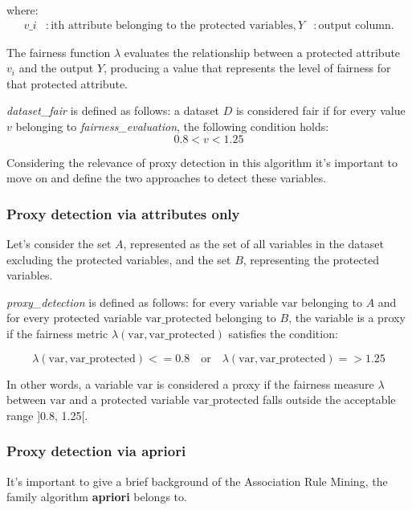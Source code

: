 \documentclass[12pt,a4paper,openright,twoside]{book}
\begin{document}
where:
\begin{align*}
v\_i & : \text{ith attribute belonging to the protected variables}, Y & : \text{output column}.
\end{align*}

The fairness function \( \lambda \) evaluates the relationship between a protected attribute \( v_i \) and the output \( Y \), producing a value that represents the level of fairness for that protected attribute. 


\textit{dataset\_fair} is defined as follows: a dataset \( D \) is considered fair if for every value \( v \) belonging to \textit{fairness\_evaluation}, the following condition holds:
\[ 0.8  < v < 1.25 \] 


Considering the relevance of proxy detection in this algorithm it's important to move on and define the two approaches to detect these variables. 


\subsubsection{Proxy detection via attributes only}
Let's consider the set \( A \), represented as the set of all variables in the dataset excluding the protected variables, and the set \( B \), representing the protected variables.

\textit{proxy\_detection} is defined as follows: for every variable \( \text{var} \) belonging to \( A \) and for every protected variable \( \text{var\_protected} \) belonging to \( B \), the variable is a proxy if the fairness metric \( \lambda(\text{var}, \text{var\_protected}) \) satisfies the condition:

\[
\lambda(\text{var}, \text{var\_protected}) <= 0.8 \quad \text{or} \quad \lambda(\text{var}, \text{var\_protected}) => 1.25
\]

In other words, a variable \( \text{var} \) is considered a proxy if the fairness measure \( \lambda \) between \( \text{var} \) and a protected variable \( \text{var\_protected} \) falls outside the acceptable range ]0.8, 1.25[. 


\subsubsection{Proxy detection via apriori}
It's important to give a brief background of the Association Rule Mining, the family algorithm \textbf{apriori} belongs to.
\end{document}
